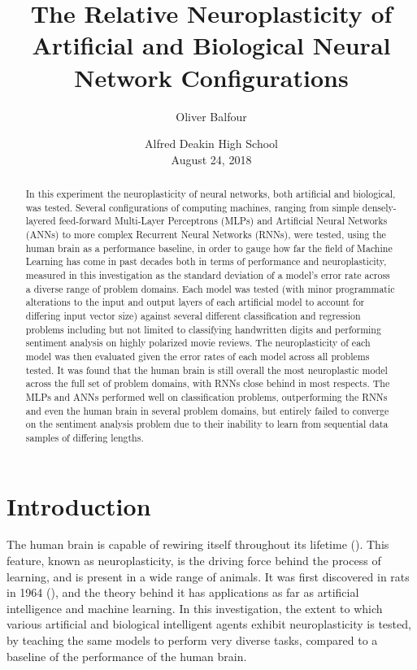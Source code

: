 \documentclass[]{report}
\title{
	The Relative Neuroplasticity of Artificial
	\linebreak
	and Biological Neural Network Configurations
}
\author{Oliver Balfour}
\date{%
	Alfred Deakin High School\\[2ex]%
	August 24, 2018
}
\begin{document}
\maketitle

\begin{abstract}
	In this experiment the neuroplasticity of neural networks, both artificial and biological, was tested. Several configurations of computing machines, ranging from simple densely-layered feed-forward Multi-Layer Perceptrons (MLPs) and Artificial Neural Networks (ANNs) to more complex Recurrent Neural Networks (RNNs), were tested, using the human brain as a performance baseline, in order to gauge how far the field of Machine Learning has come in past decades both in terms of performance and neuroplasticity, measured in this investigation as the standard deviation of a model's error rate across a diverse range of problem domains. Each model was tested (with minor programmatic alterations to the input and output layers of each artificial model to account for differing input vector size) against several different classification and regression problems including but not limited to classifying handwritten digits and performing sentiment analysis on highly polarized movie reviews. The neuroplasticity of each model was then evaluated given the error rates of each model across all problems tested. It was found that the human brain is still overall the most neuroplastic model across the full set of problem domains, with RNNs close behind in most respects. The MLPs and ANNs performed well on classification problems, outperforming the RNNs and even the human brain in several problem domains, but entirely failed to converge on the sentiment analysis problem due to their inability to learn from sequential data samples of differing lengths.
\end{abstract}

\tableofcontents
\newpage

\section{Introduction}

The human brain is capable of rewiring itself throughout its lifetime (\cite{draganski2004neuroplasticity}). This feature, known as neuroplasticity, is the driving force behind the process of learning, and is present in a wide range of animals. It was first discovered in rats in 1964 (\cite{bennett1964chemical}), and the theory behind it has applications as far as artificial intelligence and machine learning. In this investigation, the extent to which various artificial and biological intelligent agents exhibit neuroplasticity is tested, by teaching the same models to perform very diverse tasks, compared to a baseline of the performance of the human brain.
\end{document}
